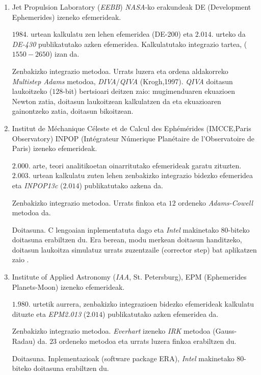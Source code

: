 \begin{enumerate}
\item Jet Propulsion Laboratory (\emph{EEBB}) \emph{NASA}-ko erakundeak DE (Development Ephemerides) izeneko efemerideak.

      $1984$. urtean kalkulatu zen lehen efemeridea (DE-200) eta $2.014$. urteko da \emph{DE-430} \cite{Folkner2014} publikatutako azken efemeridea. Kalkulatutako integrazio tartea, ($1550-2650$) izan da.

      Zenbakizko integrazio metodoa. Urrats luzera eta  ordena aldakorreko \emph{Multistep Adams} metodoa, \emph{DIVA}/\emph{QIVA} (Krogh,1997). \emph{QIVA} doitasun laukoitzeko ($128$-bit) bertsioari deitzen zaio: mugimenduaren ekuazioen Newton zatia, doitasun laukoitzean kalkulatzen da eta ekuazioaren gainontzeko zatia, doitasun bikoitzean.

\item Institut de Méchanique Céleste et de Calcul des Ephémérides (IMCCE,Paris Observatory) INPOP (Intégrateur Númerique Planétaire de l'Observatoire de Paris) izeneko efemerideak.
      
      $2.000$. arte, teori analitikoetan oinarritutako efemerideak garatu zituzten. $2.003$. urtean kalkulatu zuten lehen zenbakizko integrazio bidezko efemeridea eta \emph{INPOP13c} ($2.014$) publikatutako azkena da.
           
	  Zenbakizko integrazio metodoa. Urrats finkoa eta $12$ ordeneko \emph{Adams-Cowell} metodoa da.
	  
	  Doitasuna. C lengoaian inplementatuta dago eta \emph{Intel} makinetako $80$-biteko doitasuna erabiltzen du. Era berean, modu merkean doitasun handitzeko, doitasun laukoitza simulatuz urrats zuzentzaile (corrector step) bat aplikatzen zaio \cite{Fienga2008}.  
	  
  
\item Institute of Applied Astronomy (\emph{IAA}, St. Petersburg), EPM (Ephemerides Planets-Moon) izeneko efemerideak.
      
      $1.980$. urtetik aurrera, zenbakizko integrazioen bidezko efemerideak kalkulatu dituzte eta  \emph{EPM2.013} ($2.014$) \cite{Pitjeva2014} publikatutako azken efemeridea da.
      
      Zenbakizko integrazio metodoa. \emph{Everhart} izeneko \emph{IRK} metodoa (Gauss-Radau) da. $23$ ordeneko metodoa eta urrats luzera finkoa erabiltzen du.
            
      Doitasuna. Inplementazioak (software package ERA), \emph{Intel} makinetako $80$-biteko doitasuna erabiltzen du.
      
\end{enumerate}


